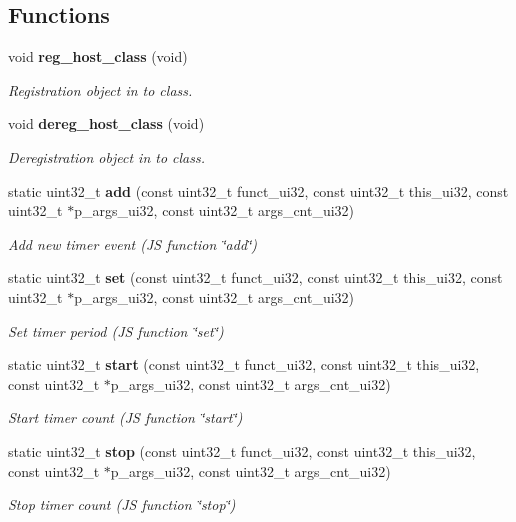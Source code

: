 \subsection*{Functions}
\begin{DoxyCompactItemize}
\item 
void \textbf{ reg\+\_\+host\+\_\+class} (void)
\begin{DoxyCompactList}\small\item\em Registration object in to class. \end{DoxyCompactList}\item 
void \textbf{ dereg\+\_\+host\+\_\+class} (void)
\begin{DoxyCompactList}\small\item\em Deregistration object in to class. \end{DoxyCompactList}\item 
static uint32\+\_\+t \textbf{ add} (const uint32\+\_\+t funct\+\_\+ui32, const uint32\+\_\+t this\+\_\+ui32, const uint32\+\_\+t $\ast$p\+\_\+args\+\_\+ui32, const uint32\+\_\+t args\+\_\+cnt\+\_\+ui32)
\begin{DoxyCompactList}\small\item\em Add new timer event (JS function \char`\"{}add\char`\"{}) \end{DoxyCompactList}\item 
static uint32\+\_\+t \textbf{ set} (const uint32\+\_\+t funct\+\_\+ui32, const uint32\+\_\+t this\+\_\+ui32, const uint32\+\_\+t $\ast$p\+\_\+args\+\_\+ui32, const uint32\+\_\+t args\+\_\+cnt\+\_\+ui32)
\begin{DoxyCompactList}\small\item\em Set timer period (JS function \char`\"{}set\char`\"{}) \end{DoxyCompactList}\item 
static uint32\+\_\+t \textbf{ start} (const uint32\+\_\+t funct\+\_\+ui32, const uint32\+\_\+t this\+\_\+ui32, const uint32\+\_\+t $\ast$p\+\_\+args\+\_\+ui32, const uint32\+\_\+t args\+\_\+cnt\+\_\+ui32)
\begin{DoxyCompactList}\small\item\em Start timer count (JS function \char`\"{}start\char`\"{}) \end{DoxyCompactList}\item 
static uint32\+\_\+t \textbf{ stop} (const uint32\+\_\+t funct\+\_\+ui32, const uint32\+\_\+t this\+\_\+ui32, const uint32\+\_\+t $\ast$p\+\_\+args\+\_\+ui32, const uint32\+\_\+t args\+\_\+cnt\+\_\+ui32)
\begin{DoxyCompactList}\small\item\em Stop timer count (JS function \char`\"{}stop\char`\"{}) \end{DoxyCompactList}\item 

\end{DoxyCompactItemize}
